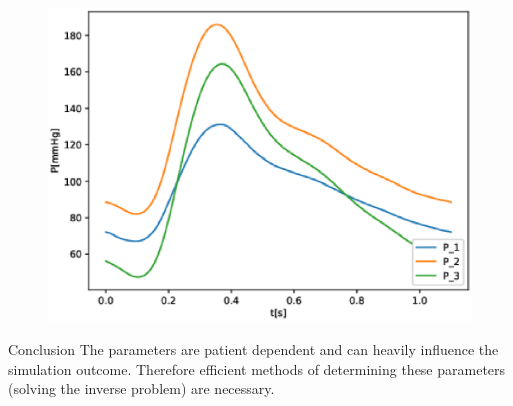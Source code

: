 \documentclass[compress]{beamer}
\begin{document}
\begin{frame}
\begin{figure}
\begin{center}
\begin{minipage}[t][0.35\paperheight][t]{\textwidth}
\begin{minipage}{0.44\textwidth}
					\includegraphics[width=\textwidth]{images/compare_output_params_P_P.eps}
				\end{minipage}
			\end{minipage}
		\end{center}
	\end{figure}
	\begin{minipage}[t][0.44\paperheight][t]{\textwidth}
		\hfill
		\begin{block}{Conclusion}
			The parameters are patient dependent and can heavily influence the simulation outcome. Therefore efficient methods of determining these parameters (solving the inverse problem) are necessary.
		\end{block}
	\end{minipage}
\end{frame}
\end{document}
